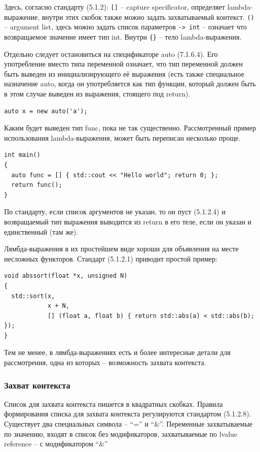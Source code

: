 \documentclass[a4paper,12pt,oneside]{article}
\begin{document}
Здесь, согласно стандарту (5.1.2): 
\lstinline![]! -- capture specificator, определяет lambda-выражение, внутри этих скобок также можно задать захватываемый контекст.
\lstinline!()! -- argument list, здесь можно задать список параметров
\lstinline!-> int! -- означает что возвращаемое значение имеет тип int.
Внутри \lstinline!{}! -- тело lambda-выражения.

Отдельно следует остановиться на спецификаторе auto (7.1.6.4). Его употребление вместо типа переменной означает, что тип переменной должен быть выведен из инициализирующего её выражения (есть также специальное назначение auto, когда он употребляется как тип функции, который должен быть в этом случае выведен из выражения, стоящего под return).

\begin{lstlisting}
auto x = new auto('a');
\end{lstlisting}

Каким будет выведен тип func, пока не так существенно. Рассмотренный пример использования lambda-выражения, может быть переписан несколько проще.

\begin{lstlisting}
int main()
{
  auto func = [] { std::cout << "Hello world"; return 0; };
  return func(); 
}
\end{lstlisting}

По стандарту, если список аргументов не указан, то он пуст (5.1.2.4) и возвращаемый тип выражения выводится из return в его теле, если он указан и единственный (там же).

Лямбда-выражения в их простейшем виде хороши для объявления на месте несложных функторов. Стандарт (5.1.2.1) приводит простой пример:

\begin{lstlisting}
void abssort(float *x, unsigned N)
{
  std::sort(x, 
            x + N,
            [] (float a, float b) { return std::abs(a) < std::abs(b); });
}
\end{lstlisting}

Тем не менее, в лямбда-выражениях есть и более интересные детали для рассмотрения, одна из которых -- возможность захвата контекста.

\subsubsection{Захват контекста}

Список для захвата контекста пишется в квадратных скобках. Правила формирования списка для захвата контекста регулируются стандартом (5.1.2.8). Существует два специальных символа -- ``='' и ``\&''. Переменные захватываемые по значению, входят в список без модификаторов, захватываемые по lvalue reference -- с модификатором ``\&''
\end{document}
